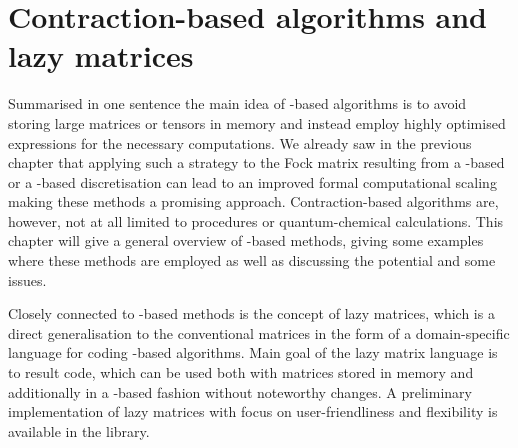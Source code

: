 \chapter{Contraction-based algorithms and lazy matrices}
\label{ch:LazyMatrices}
%
%

\noindent
Summarised in one sentence the main idea of \contraction-based algorithms
is to avoid storing large matrices or tensors in memory
and instead employ highly optimised
\contraction expressions for the necessary computations.
We already saw in the previous chapter that applying
such a strategy to the Fock matrix resulting from a \FE-based
or a \CS-based discretisation
can lead to an improved formal computational scaling
making these methods a promising approach.
Contraction-based algorithms are, however,
not at all limited to \SCF procedures or quantum-chemical calculations.
This chapter will give a general overview
of \contraction-based methods,
giving some examples where these methods are employed
as well as discussing the potential and some issues.

Closely connected to \contraction-based methods is the concept of lazy matrices,
which is a direct generalisation to the conventional matrices
in the form of a domain-specific language
for coding \contraction-based algorithms.
Main goal of the lazy matrix language is to result code,
which can be used both with matrices stored in memory
and additionally in a \contraction-based fashion without noteworthy changes.
A preliminary \cpp implementation of lazy matrices
with focus on user-friendliness and flexibility
is available in the \lazyten library.




